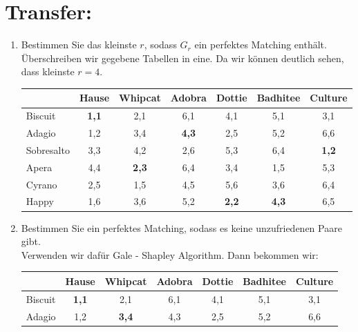     \section*{Transfer:}
    \begin{enumerate}[label=(\alph*)]
    	\item Bestimmen Sie das kleinste $r$, sodass $G_r$ ein perfektes Matching enthält.\\
        Überschreiben wir gegebene Tabellen in eine. Da wir können deutlich sehen, dass kleinste $r=4$. %
        \begin{table}[h]\centering
            \begin{tabular}{|l|c|c|c|c|c|c|}
            \hline
            ~          & Hause     & Whipcat   & Adobra    & Dottie    & Badhitee  & Culture   \\ \hline
            Biscuit    & {\bf 1,1} & 2,1       & 6,1       & 4,1       & 5,1       & 3,1       \\ \hline
            Adagio     & 1,2       & 3,4       & {\bf 4,3} & 2,5       & 5,2       & 6,6       \\ \hline
            Sobresalto & 3,3       & 4,2       & 2,6       & 5,3       & 6,4       & {\bf 1,2} \\ \hline
            Apera      & 4,4       & {\bf 2,3} & 6,4       & 3,4       & 1,5       & 5,3       \\ \hline
            Cyrano     & 2,5       & 1,5       & 4,5       & 5,6       & 3,6       & 6,4       \\ \hline
            Happy      & 1,6       & 3,6       & 5,2       & {\bf 2,2} & {\bf 4,3} & 6,5       \\ \hline
            \end{tabular}
        \end{table}
        \item Bestimmen Sie ein perfektes Matching, sodass es keine unzufriedenen Paare gibt.\\
        Verwenden wir dafür Gale - Shapley Algorithm. Dann bekommen wir:
        \begin{table}[h]\centering
            \begin{tabular}{|l|c|c|c|c|c|c|}
            \hline
            ~          & Hause     & Whipcat   & Adobra   & Dottie   & Badhitee   & Culture   \\ \hline
            Biscuit    & {\bf 1,1} & 2,1       & 6,1      & 4,1      & 5,1        & 3,1       \\ \hline
            Adagio     & 1,2       & {\bf3,4}  & 4,3      & 2,5      & 5,2        & 6,6       \\ \hline

\end{tabular}
\end{table}
\end{enumerate}
